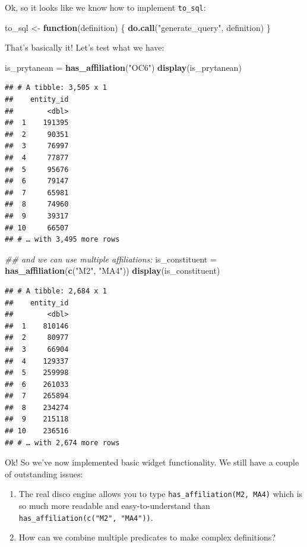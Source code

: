 \documentclass[]{book}
\newenvironment{Shaded}{\begin{snugshade}}{\end{snugshade}}
\newcommand{\CommentTok}[1]{\textcolor[rgb]{0.56,0.35,0.01}{\textit{#1}}}
\newcommand{\ControlFlowTok}[1]{\textcolor[rgb]{0.13,0.29,0.53}{\textbf{#1}}}
\newcommand{\KeywordTok}[1]{\textcolor[rgb]{0.13,0.29,0.53}{\textbf{#1}}}
\newcommand{\NormalTok}[1]{#1}
\newcommand{\StringTok}[1]{\textcolor[rgb]{0.31,0.60,0.02}{#1}}
\providecommand{\tightlist}{%
  \setlength{\itemsep}{0pt}\setlength{\parskip}{0pt}}
\begin{document}
Ok, so it looks like we know how to implement \texttt{to\_sql}:

\begin{Shaded}
\begin{Highlighting}[]
\NormalTok{to_sql <-}\StringTok{ }\ControlFlowTok{function}\NormalTok{(definition) \{}
    \KeywordTok{do.call}\NormalTok{(}\StringTok{"generate_query"}\NormalTok{, definition)}
\NormalTok{\}}
\end{Highlighting}
\end{Shaded}

That's basically it! Let's test what we have:

\begin{Shaded}
\begin{Highlighting}[]
\NormalTok{is_prytanean =}\StringTok{ }\KeywordTok{has_affiliation}\NormalTok{(}\StringTok{"OC6"}\NormalTok{)}
\KeywordTok{display}\NormalTok{(is_prytanean)}
\end{Highlighting}
\end{Shaded}

\begin{verbatim}
## # A tibble: 3,505 x 1
##    entity_id
##        <dbl>
##  1    191395
##  2     90351
##  3     76997
##  4     77877
##  5     95676
##  6     79147
##  7     65981
##  8     74960
##  9     39317
## 10     66507
## # … with 3,495 more rows
\end{verbatim}

\begin{Shaded}
\begin{Highlighting}[]
\CommentTok{## and we can use multiple affiliations:}
\NormalTok{is_constituent =}\StringTok{ }\KeywordTok{has_affiliation}\NormalTok{(}\KeywordTok{c}\NormalTok{(}\StringTok{"M2"}\NormalTok{, }\StringTok{"MA4"}\NormalTok{))}
\KeywordTok{display}\NormalTok{(is_constituent)}
\end{Highlighting}
\end{Shaded}

\begin{verbatim}
## # A tibble: 2,684 x 1
##    entity_id
##        <dbl>
##  1    810146
##  2     80977
##  3     66904
##  4    129337
##  5    259998
##  6    261033
##  7    265894
##  8    234274
##  9    215118
## 10    236516
## # … with 2,674 more rows
\end{verbatim}

Ok! So we've now implemented basic widget functionality. We still have a couple of outstanding issues:

\begin{enumerate}
\def\labelenumi{\arabic{enumi}.}
\tightlist
\item
  The real disco engine allows you to type \texttt{has\_affiliation(M2,\ MA4)} which is so much more readable and easy-to-understand than \texttt{has\_affiliation(c("M2",\ "MA4"))}.
\item
  How can we combine multiple predicates to make complex definitions?
\end{enumerate}
\end{document}
